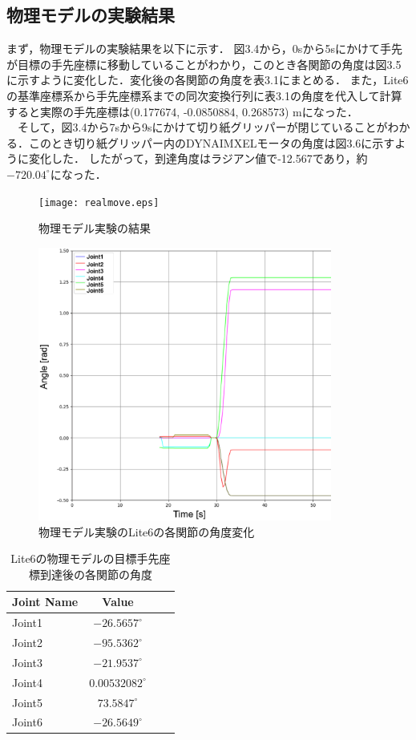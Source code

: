 \subsection{物理モデルの実験結果}
まず，物理モデルの実験結果を以下に示す．
図3.4から，0sから5sにかけて手先が目標の手先座標に移動していることがわかり，このとき各関節の角度は図3.5に示すように変化した．変化後の各関節の角度を表3.1にまとめる．
また，Lite6の基準座標系から手先座標系までの同次変換行列に表3.1の角度を代入して計算すると実際の手先座標は(0.177674, -0.0850884, 0.268573) mになった．\\
　そして，図3.4から7sから9sにかけて切り紙グリッパーが閉じていることがわかる．このとき切り紙グリッパー内のDYNAIMXELモータの角度は図3.6に示すように変化した．
したがって，到達角度はラジアン値で-12.567であり，約$-720.04^\circ$になった．

\begin{figure}[htbt]
    \centering
     \texttt{[image: realmove.eps]}
     \caption{物理モデル実験の結果}
     \label{fig:f2}
\end{figure}

\begin{figure}[htbt]
    \centering
     \includegraphics[height=90mm]{expt_8_joint_states.eps}
     \caption{物理モデル実験のLite6の各関節の角度変化}
     \label{fig:f2}
\end{figure}

\begin{table}[htb]
	\centering
	\caption{Lite6の物理モデルの目標手先座標到達後の各関節の角度}
	\begin{tabular}{lcrc} \hline
	Joint Name& Value     \\ \hline \hline
	Joint1    & $-26.5657^\circ$ \\
	Joint2    & $-95.5362^\circ$ \\
	Joint3    & $-21.9537^\circ$ \\
	Joint4    & $0.00532082^\circ$ \\
	Joint5    & $73.5847^\circ$ \\
    Joint6    & $-26.5649^\circ$ \\ \hline
	\end{tabular}
\end{table}

